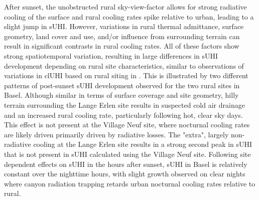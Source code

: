 \begin{bibunit}
After sunset, the unobstructed rural sky-view-factor allows for strong radiative cooling of the surface and rural cooling rates spike relative to urban, leading to a slight jump in sUHI. However, variations in rural thermal admittance, surface geometry, land cover and use, and/or influence from surrounding terrain can result in significant contrasts in rural cooling rates. All of these factors show strong spatiotemporal variation, resulting in large differences in sUHI development depending on rural site characteristics, similar to observations of variations in clUHI based on rural siting in \citep{Runnalls2000}. This is illustrated by two different patterns of post-sunset sUHI development observed for the two rural sites in Basel. Although similar in terms of surface coverage and site geometry, hilly terrain surrounding the Lange Erlen site results in suspected cold air drainage and an increased rural cooling rate, particularly following hot, clear sky days. This effect is not present at the Village Neuf site, where nocturnal cooling rates are likely driven primarily driven by radiative losses. The "extra", largely non-radiative cooling at the Lange Erlen site results in a strong second peak in sUHI that is not present in sUHI calculated using the Village Neuf site. Following site dependent effects on sUHI in the hours after sunset, sUHI in Basel is relatively constant over the nighttime hours, with slight growth observed on clear nights where canyon radiation trapping retards urban nocturnal cooling rates relative to rural. 




\end{bibunit}
